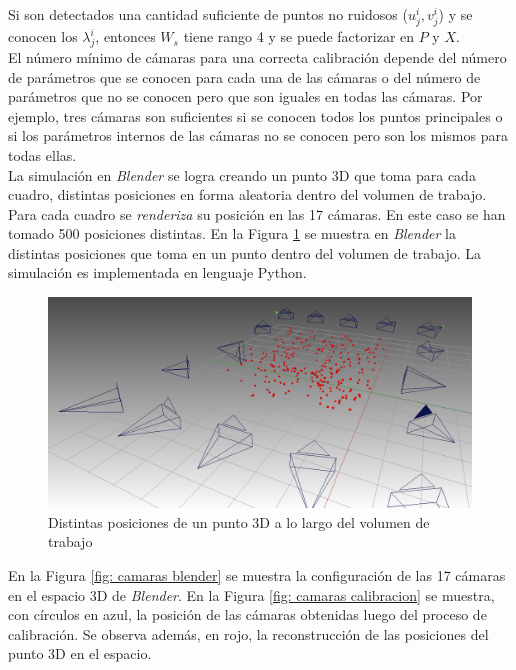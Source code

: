Si son detectados una cantidad suficiente de puntos no ruidosos ($u_j^i, v_j^i$) y se conocen los $\lambda_j^i$, entonces $W_s$ tiene rango 4  y se puede factorizar en $P$ y $X$.\\

El número mínimo de cámaras para una correcta calibración depende del número de parámetros que se conocen para cada una de las cámaras o del número de parámetros que no se conocen pero que son iguales en todas las cámaras. Por ejemplo, tres cámaras son suficientes si se conocen todos los puntos principales o si los parámetros internos de las cámaras no se conocen pero son los mismos para todas ellas.\\

La simulación en \emph{Blender} se logra creando un punto 3D que toma para cada cuadro, distintas posiciones en forma aleatoria dentro del volumen de trabajo. Para cada cuadro se \textit{renderiza} su posición en las 17 cámaras. En este caso se han tomado 500 posiciones distintas. En la Figura \ref{fig: blender toolbox laser} se muestra en \emph{Blender} la distintas posiciones que toma en un punto dentro del volumen de trabajo. La simulación es implementada en lenguaje Python.\\

\begin{figure}[ht!]
\begin{center}
\includegraphics[scale=0.32]{img/calibracion/blender_toolbox_laser.png}
\end{center}
\caption{Distintas posiciones de un punto 3D a lo largo del volumen de trabajo}
\label{fig: blender toolbox laser}
\end{figure}

En la Figura \ref{fig: camaras blender} se muestra la configuración de las 17 cámaras en el espacio 3D de \emph{Blender}. En la Figura \ref{fig: camaras calibracion} se muestra, con círculos en azul, la posición de las cámaras obtenidas luego del proceso de calibración. Se observa además, en rojo, la reconstrucción de las posiciones del punto 3D en el espacio. \\


